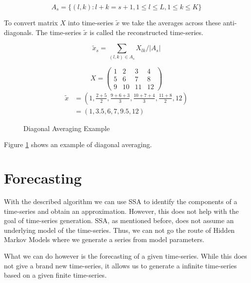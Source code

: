 \begin{equation}
A_{s}=\{(l, k): l+k=s+1,1 \leq l \leq L, 1 \leq k \leq K\}
\end{equation}

To convert matrix $X$ into time-series $\tilde{x}$ we take the averages across these anti-diagonals. The time-series $\tilde{x}$ is called the reconstructed time-series. 

\begin{equation}
    \widetilde{x}_{s}=\sum_{(l, k) \in A_{s}} X_{l k} /\left|A_{s}\right|
\end{equation}


\begin{figure}
   \begin{equation*}
      X = 
      \begin{pmatrix}
         1 & 2 & 3 & 4 \\
         5 & 6 & 7 & 8 \\
         9 & 10 & 11 & 12
      \end{pmatrix}
   \end{equation*}
   \begin{equation*}
      \begin{aligned}
      \widetilde{x} &= (1, \frac{2+5}{2}, \frac{9 + 6 + 3}{3}, \frac{10 + 7 + 4}{3}, \frac{11 + 8}{2}, 12) \\
      &= (1, 3.5, 6, 7, 9.5, 12)
      \end{aligned}
   \end{equation*}
\caption{Diagonal Averaging Example}
\label{fig:diagonal-averaging}
\end{figure}

Figure \ref{fig:diagonal-averaging} shows an example of diagonal averaging. 

\section{Forecasting}

With the described algorithm we can use SSA to identify the components of a time-series and obtain an approximation. However, this does not help with the goal of time-series generation. SSA, as mentioned before, does not assume an underlying model of the time-series. Thus, we can not go the route of Hidden Markov Models where we generate a series from model parameters. 

What we can do however is the forecasting of a given time-series. While this does not give a brand new time-series, it allows us to generate a infinite time-series based on a given finite time-series.

